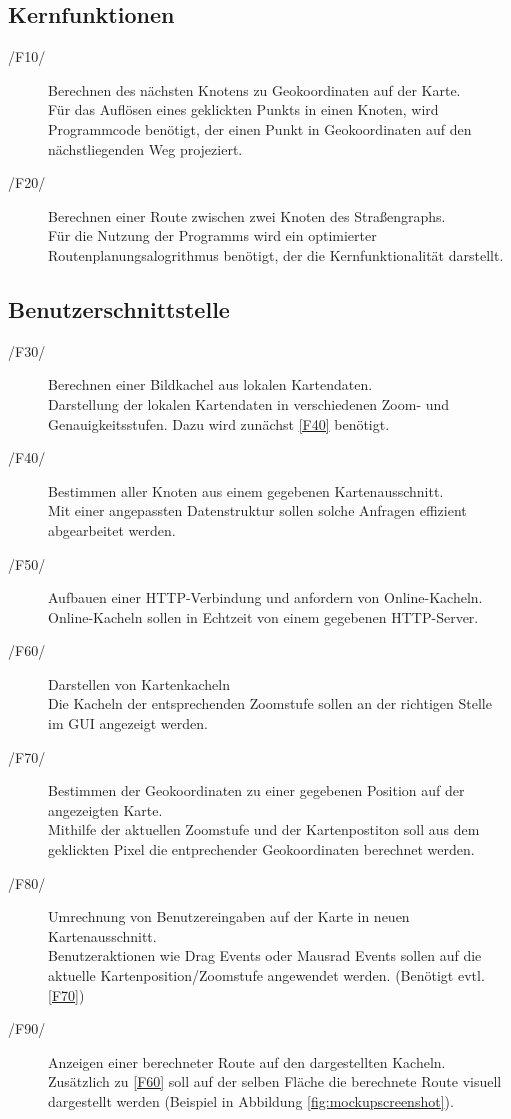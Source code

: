 \documentclass[a4paper, 11pt]{article}
\begin{document}
\subsection{Kernfunktionen}
\begin{description}
\item [/F10/]
Berechnen des nächsten Knotens zu Geokoordinaten auf der Karte.\\
Für das Auflösen eines geklickten Punkts in einen Knoten, wird Programmcode benötigt, der einen Punkt in Geokoordinaten auf den nächstliegenden Weg projeziert.
\item[/F20/]
Berechnen einer Route zwischen zwei Knoten des Straßengraphs.\\
Für die Nutzung der Programms wird ein optimierter Routenplanungsalogrithmus benötigt, der die Kernfunktionalität darstellt.
\end{description}
\subsection{Benutzerschnittstelle}
\begin{description}
\item[/F30/]
Berechnen einer Bildkachel aus lokalen Kartendaten.\\
Darstellung der lokalen Kartendaten in verschiedenen Zoom- und Genauigkeitsstufen. Dazu wird zunächst \ref{F40} benötigt.
\item[/F40/\label{F40}]
Bestimmen aller Knoten aus einem gegebenen Kartenausschnitt.\\
Mit einer angepassten Datenstruktur sollen solche Anfragen effizient abgearbeitet werden.
\item[/F50/]
Aufbauen einer HTTP-Verbindung und anfordern von Online-Kacheln.\\
Online-Kacheln sollen in Echtzeit von einem gegebenen HTTP-Server.
\item[/F60/\label{F60}]
Darstellen von Kartenkacheln\\
Die Kacheln der entsprechenden Zoomstufe sollen an der richtigen Stelle im GUI angezeigt werden.
\item[/F70/\label{F70}]
Bestimmen der Geokoordinaten zu einer gegebenen Position auf der angezeigten Karte.\\
Mithilfe der aktuellen Zoomstufe und der Kartenpostiton soll aus dem geklickten Pixel die entprechender Geokoordinaten berechnet werden.
\item[/F80/]
Umrechnung von Benutzereingaben auf der Karte in neuen Kartenausschnitt.\\
Benutzeraktionen wie Drag Events oder Mausrad Events sollen auf die aktuelle Kartenposition/Zoomstufe angewendet werden. (Benötigt evtl. \ref{F70})
\item[/F90/]
Anzeigen einer berechneter Route auf den dargestellten Kacheln.\\
Zusätzlich zu \ref{F60} soll auf der selben Fläche die berechnete Route visuell dargestellt werden (Beispiel in  Abbildung \ref{fig:mockupscreenshot}).
\end{description}
\end{document}
